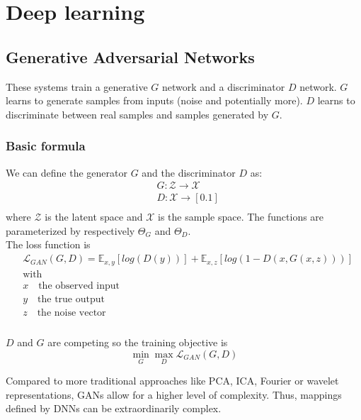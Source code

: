 \documentclass[../main.tex]{subfiles}
\begin{document}
\chapter{Deep learning}

\section{Generative Adversarial Networks}
These systems train a generative $G$ network and a discriminator $D$ network. $G$ learns to generate
samples from inputs (noise and potentially more). $D$ learns to discriminate between real samples and
samples generated by $G$.

\subsection{Basic formula}
We can define the generator $G$ and the discriminator $D$ as:
\begin{align*}
    &G: \mathcal{Z} \to \mathcal{X} \\
    &D: \mathcal{X} \to [0. 1] \\
\end{align*}
where $\mathcal{Z}$ is the latent space and $\mathcal{X}$ is the sample space. The functions are
parameterized by respectively $\Theta_G$ and $\Theta_D$. \\
The loss function is
\begin{align*}
    &\mathcal{L}_{GAN}(G, D) = \mathbb{E}_{x,y}[log(D(y))] + \mathbb{E}_{x,z}[log(1-D(x, G(x, z)))] \\
    &\text{with} \\
    & x\quad \text{the observed input} \\
    & y\quad \text{the true output} \\
    & z\quad \text{the noise vector} \\
\end{align*} \\
$D$ and $G$ are competing so the training objective is
\begin{equation}
    \min_G \max_D \mathcal{L}_{GAN}(G, D)
\end{equation}

Compared to more traditional approaches like PCA, ICA, Fourier or wavelet representations, GANs allow
for a higher level of complexity. Thus, mappings defined by DNNs can be extraordinarily complex. \\
\end{document}

